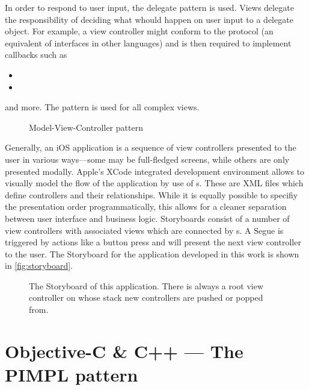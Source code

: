 In order to respond to user input, the delegate pattern \citep[see]{gamma1995}
is used. Views delegate the responsibility of deciding what whould happen on
user input to a delegate object. For example, a view controller might conform to
the  protocol (an equivalent of interfaces in other
languages) and is then required to implement callbacks such as
\begin{itemize}
   \item {}
   \item {}
\end{itemize}
and more. The pattern is used for all complex views.

\begin{figure}[h]
   {\centering      
      
      \caption{Model-View-Controller pattern}
   \label{fig:mvc}}
\end{figure}

Generally, an iOS application is a sequence of view controllers presented to the
user in various ways---some may be full-fledged screens, while others are only
presented modally. Apple's XCode integrated development environment allows to
visually model the flow of the application by use of s. These
are XML files which define controllers and their relationships. While
it is equally possible to specifiy the presentation order programmatically, this
allows for a cleaner separation between user interface and business logic.
Storyboards consist of a number of view controllers with associated views which
are connected by s. A Segue is triggered by actions like a button
press and will present the next view controller to the user. The Storyboard for
the application developed in this work is shown in \autoref{fig:storyboard}.

\begin{figure}[h]
   {\centering      
      
      \caption[Storyboard example]{The Storyboard of this application. There is
      always a root view controller on whose stack new controllers are pushed or popped from.}
   \label{fig:storyboard}}
\end{figure}

\section{Objective-C \& C++ --- The PIMPL pattern}

